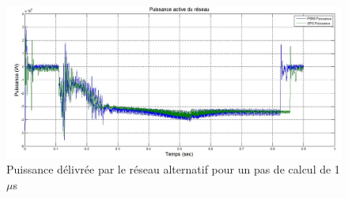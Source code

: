 \begin{figure}[htb]
\centering
\includegraphics[scale=0.5]{fig/DCP_AFE/1u/PUI.jpg}
\caption{Puissance délivrée par le réseau alternatif pour un pas de calcul de 1$\mu$s}
\label{AF_DC_CHA2}
\end{figure}


